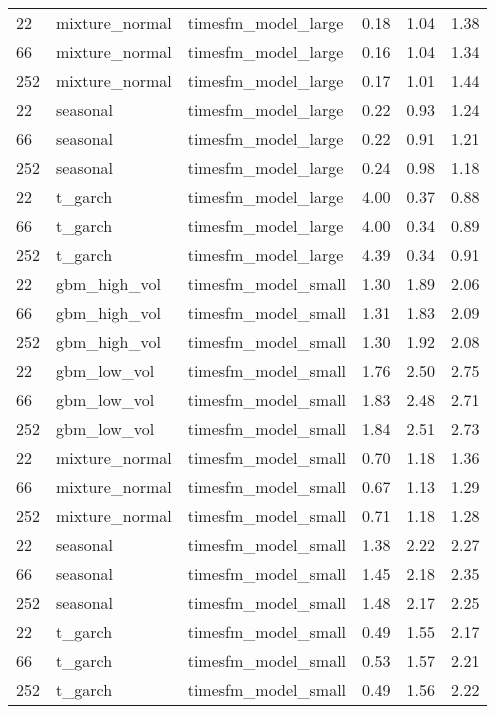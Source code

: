 {\begin{tabular}{lllrrr}
\midrule
22 & mixture\_normal & timesfm\_model\_large & 0.18 & 1.04 & 1.38 \\
66 & mixture\_normal & timesfm\_model\_large & 0.16 & 1.04 & 1.34 \\
252 & mixture\_normal & timesfm\_model\_large & 0.17 & 1.01 & 1.44 \\
\midrule
22 & seasonal & timesfm\_model\_large & 0.22 & 0.93 & 1.24 \\
66 & seasonal & timesfm\_model\_large & 0.22 & 0.91 & 1.21 \\
252 & seasonal & timesfm\_model\_large & 0.24 & 0.98 & 1.18 \\
\midrule
22 & t\_garch & timesfm\_model\_large & 4.00 & 0.37 & 0.88 \\
66 & t\_garch & timesfm\_model\_large & 4.00 & 0.34 & 0.89 \\
252 & t\_garch & timesfm\_model\_large & 4.39 & 0.34 & 0.91 \\
\midrule
22 & gbm\_high\_vol & timesfm\_model\_small & 1.30 & 1.89 & 2.06 \\
66 & gbm\_high\_vol & timesfm\_model\_small & 1.31 & 1.83 & 2.09 \\
252 & gbm\_high\_vol & timesfm\_model\_small & 1.30 & 1.92 & 2.08 \\
\midrule
22 & gbm\_low\_vol & timesfm\_model\_small & 1.76 & 2.50 & 2.75 \\
66 & gbm\_low\_vol & timesfm\_model\_small & 1.83 & 2.48 & 2.71 \\
252 & gbm\_low\_vol & timesfm\_model\_small & 1.84 & 2.51 & 2.73 \\
\midrule
22 & mixture\_normal & timesfm\_model\_small & 0.70 & 1.18 & 1.36 \\
66 & mixture\_normal & timesfm\_model\_small & 0.67 & 1.13 & 1.29 \\
252 & mixture\_normal & timesfm\_model\_small & 0.71 & 1.18 & 1.28 \\
\midrule
22 & seasonal & timesfm\_model\_small & 1.38 & 2.22 & 2.27 \\
66 & seasonal & timesfm\_model\_small & 1.45 & 2.18 & 2.35 \\
252 & seasonal & timesfm\_model\_small & 1.48 & 2.17 & 2.25 \\
\midrule
22 & t\_garch & timesfm\_model\_small & 0.49 & 1.55 & 2.17 \\
66 & t\_garch & timesfm\_model\_small & 0.53 & 1.57 & 2.21 \\
252 & t\_garch & timesfm\_model\_small & 0.49 & 1.56 & 2.22 \\

\end{tabular}}
